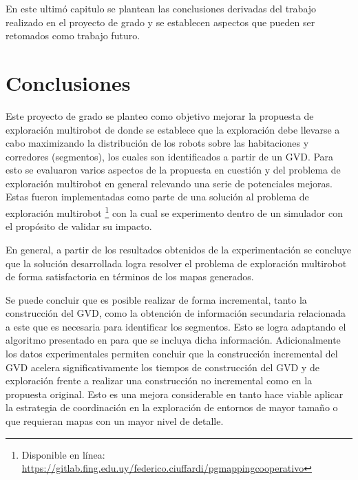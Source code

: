 En este ultimó capitulo se plantean las conclusiones derivadas del trabajo
realizado en el proyecto de grado y se establecen aspectos que pueden ser
retomados como trabajo futuro.

\section{Conclusiones}


Este proyecto de grado se planteo como objetivo mejorar la propuesta de
exploración multirobot de \cite{wurm2008coordinated} donde se establece que la
exploración debe llevarse a cabo maximizando la distribución de los robots
sobre las habitaciones y corredores (segmentos), los cuales son identificados a
partir de un GVD. Para esto se evaluaron varios aspectos de la propuesta en
cuestión y del problema de exploración multirobot en general relevando una
serie de potenciales mejoras. Estas fueron implementadas como parte de una
solución al problema de exploración multirobot \footnote{Disponible en línea:\\
\url{https://gitlab.fing.edu.uy/federico.ciuffardi/pgmappingcooperativo}} con
la cual se experimento dentro de un simulador con el propósito de validar su
impacto.

En general, a partir de los resultados obtenidos de la experimentación se
concluye que la solución desarrollada logra resolver el problema de exploración
multirobot de forma satisfactoria en términos de los mapas generados.

Se puede concluir que es posible realizar de forma incremental, tanto la
construcción del GVD, como la obtención de información secundaria relacionada a
este que es necesaria para identificar los segmentos. Esto se logra adaptando
el algoritmo presentado en \cite{Lau2013} para que se incluya dicha
información. Adicionalmente los datos experimentales permiten concluir que la
construcción incremental del GVD acelera significativamente los tiempos de
construcción del GVD y de exploración frente a realizar una construcción no
incremental como en la propuesta original. Esto es una mejora considerable en
tanto hace viable aplicar la estrategia de coordinación en la exploración de
entornos de mayor tamaño o que requieran mapas con un mayor nivel de detalle.

